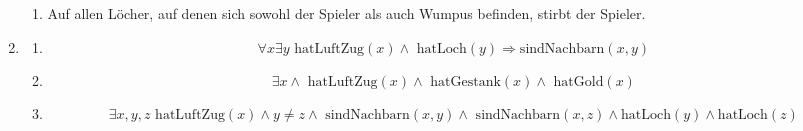 \documentclass[a4paper]{article}
\begin{document}
\begin{enumerate}
\begin{enumerate}
			\item
			Auf allen Löcher, auf denen sich sowohl der Spieler als auch Wumpus befinden, stirbt der Spieler.
		\end{enumerate}
		
		\item
		\begin{enumerate}
			\item
			\begin{equation*}
				\forall x \exists y \text{ hatLuftZug}(x) \land \text{ hatLoch}(y) \Rightarrow  \text{sindNachbarn}(x, y)
			\end{equation*}
			
			\item
			\begin{equation*}
				\exists x \land \text{ hatLuftZug}(x) \land \text{ hatGestank}(x) \land \text{ hatGold}(x)
			\end{equation*}
			
			\item
			\begin{equation*}
				\exists x, y, z \text{ hatLuftZug}(x) \land y \neq z \land \text{ sindNachbarn}(x, y) \land \text{ sindNachbarn}(x, z) \land \text{hatLoch}(y) \land \text{hatLoch}(z)
			\end{equation*}
		\end{enumerate}
	\end{enumerate}
\end{document}
